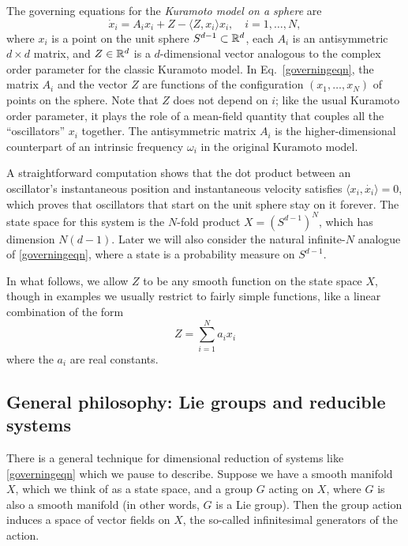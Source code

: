 \documentclass[%
 aip,
 amsmath,amssymb,
 reprint,%
]{revtex4-1}
\begin{document}
The governing equations for the \emph{Kuramoto model on a sphere} are 
\begin{equation}
 \dot x_i = A_ix_i + Z - \langle Z, x_i \rangle x_i, \quad i = 1, \dots, N,
 \label{governingeqn}
\end{equation}
where $x_i$ is a point on the unit sphere $S^{d-1} \subset {\Bbb R}^d$, each $A_i$ is an antisymmetric $d \times d$ matrix, and $Z \in {\Bbb R}^d$ is a $d$-dimensional vector analogous to the complex order parameter for the classic Kuramoto model. In Eq.~\eqref{governingeqn}, the matrix $A_i$ and the vector $Z$ are functions of the configuration $(x_1, \dots, x_N)$ of points on the sphere. Note that $Z$ does not depend on $i$; like the usual Kuramoto order parameter, it plays the role of a mean-field quantity that couples all the ``oscillators'' $x_i$ together. The antisymmetric matrix $A_i$ is the higher-dimensional counterpart of an intrinsic frequency $\omega_i$ in the original Kuramoto model. 

A straightforward computation shows that the dot product between an oscillator's instantaneous position and instantaneous velocity satisfies $\langle x_i, \dot{x_i} \rangle = 0$, which proves that oscillators that start on the unit sphere stay on it forever. The state space for this system is the $N$-fold product $X = (S^{d-1})^N$, which has dimension $N(d-1)$.  Later we will also consider the natural infinite-$N$ analogue of \eqref{governingeqn}, where a state is a probability measure on $S^{d-1}$. 

In what follows, we allow $Z$ to be any smooth function on the state space $X$, though in examples we usually restrict to fairly simple functions, like a linear combination of the form
$$
Z = \sum_{i=1}^N a_i x_i
$$
where the $a_i$ are real constants.  

\subsection{\label{sec:level2}General philosophy: Lie groups and reducible systems}

There is a general technique for dimensional reduction of systems like \eqref{governingeqn} which we pause to describe.  Suppose we have a smooth manifold $X$, which we think of as a state space,  and a group $G$ acting on $X$, where $G$ is also a smooth manifold (in other words, $G$ is a Lie group).  Then the group action induces a space of vector fields on $X$, the so-called  infinitesimal generators of the action.  
\end{document}

